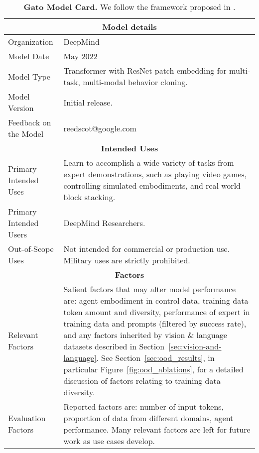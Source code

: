\documentclass[10pt]{article} \usepackage[accepted]{tmlr}
\newcommand{\model}{{Gato}}
\begin{document}
\begin{longtable}{p{}|p{}}
\caption{\textbf{\model{} Model Card.} We follow the framework proposed in \citep{mitchell2019model}.} \label{tab:model_card}\\ 
\toprule
\multicolumn{2}{c}{\textbf{Model details}}\\
\midrule
Organization                      & DeepMind \\
\midrule
Model Date                        & May 2022 \\
\midrule
Model Type                        & Transformer with ResNet patch embedding for multi-task, multi-modal behavior cloning. \\
\midrule
Model Version                     & Initial release. \\
\midrule
Feedback on the Model             & reedscot@google.com \\

\toprule
\multicolumn{2}{c}{\textbf{Intended Uses}}\\
\midrule
Primary Intended Uses   & Learn to accomplish a wide variety of tasks from expert demonstrations, such as playing video games, controlling simulated embodiments, and real world block stacking. \\
\midrule
Primary Intended Users  & DeepMind Researchers. \\
\midrule
Out-of-Scope Uses       & Not intended for commercial or production use. Military uses are strictly prohibited. \\

\toprule
\multicolumn{2}{c}{\textbf{Factors}}\\
\midrule
 Relevant Factors   & Salient factors that may alter model performance are: agent embodiment in control data,
 training data token amount and diversity, performance of expert in training data and prompts (filtered by success rate),
 and any factors inherited by vision \& language datasets described in Section~\ref{sec:vision-and-language}.
 See Section~\ref{sec:ood_results}, in particular Figure~\ref{fig:ood_ablations}, for a detailed discussion of factors relating to training data diversity. \\
\midrule
Evaluation Factors  & Reported factors are: number of input tokens, proportion of data from different domains, agent performance.
Many relevant factors are left for future work as use cases develop. \\ 


\end{longtable}
\end{document}
